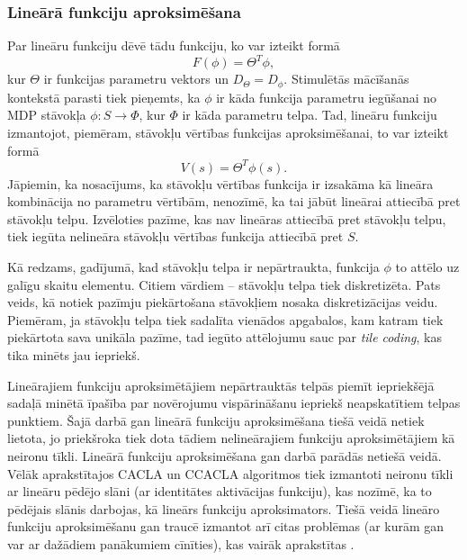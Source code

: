 \documentclass{ludis} %
\begin{document}
\subsubsection{Lineārā funkciju aproksimēšana}
Par lineāru funkciju dēvē tādu funkciju, ko var izteikt formā
\[
	F(\phi) = \Theta^T \phi,
\]
kur $\Theta$ ir funkcijas parametru vektors un $D_\Theta = D_\phi$.
Stimulētās mācīšanās kontekstā parasti tiek pieņemts, ka $\phi$ ir kāda funkcija
parametru iegūšanai no MDP stāvokļa $\phi : S \rightarrow \Phi$, kur $\Phi$ ir kāda
parametru telpa. Tad, lineāru funkciju izmantojot, piemēram, stāvokļu vērtības
funkcijas aproksimēšanai, to var izteikt formā
\[
	V(s) = \Theta^T \phi(s).
\]
Jāpiemin, ka nosacījums, ka stāvokļu vērtības funkcija ir izsakāma kā lineāra
kombinācija no parametru vērtībām, nenozīmē, ka tai jābūt lineārai attiecībā
pret stāvokļu telpu. Izvēloties pazīme, kas nav lineāras attiecībā pret stāvokļu
telpu, tiek iegūta nelineāra stāvokļu vērtības funkcija attiecībā pret $S$.

Kā redzams, gadījumā, kad stāvokļu telpa ir nepārtraukta, funkcija $\phi$ to
attēlo uz galīgu skaitu elementu. Citiem vārdiem -- stāvokļu telpa tiek
diskretizēta. Pats veids, kā notiek pazīmju piekārtošana stāvokļiem nosaka
diskretizācijas veidu. Piemēram, ja stāvokļu telpa tiek sadalīta vienādos
apgabalos, kam katram tiek piekārtota sava unikāla pazīme, tad iegūto attēlojumu
sauc par \textit{tile coding}, kas tika minēts jau iepriekš.

Lineārajiem funkciju aproksimētājiem nepārtrauktās telpās piemīt iepriekšējā
sadaļā minētā īpašība par novērojumu vispārināšanu iepriekš neapskatītiem telpas
punktiem. Šajā darbā gan lineārā funkciju aproksimēšana tiešā veidā netiek
lietota, jo priekšroka tiek dota tādiem nelineārajiem funkciju aproksimētājiem
kā neironu tīkli. Lineārā funkciju aproksimēšana gan darbā parādās netiešā
veidā. Vēlāk aprakstītajos CACLA un CCACLA algoritmos tiek izmantoti neironu
tīkli ar lineāru pēdējo slāni (ar identitātes aktivācijas funkciju), kas nozīmē,
ka to pēdējais slānis darbojas, kā lineārs funkciju aproksimators. Tiešā veidā
lineāro funkciju aproksimēšanu gan traucē izmantot arī citas problēmas (ar kurām
gan var ar dažādiem panākumiem cīnīties), kas vairāk aprakstītas
\autocite{Hasselt2012}.
\end{document}
